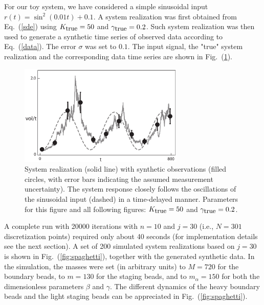 \documentclass[11pt]{article}
\theoremstyle{definition}
\begin{document}
For our toy system, we have considered a simple sinusoidal input  $r(t) = \sin^2 \left( 0.01 t \right) + 0.1$. A system realization was first obtained from Eq.~(\ref{sde}) using $K_{\mbox{\small true}} = 50$ and $\gamma_{\mbox{\small true}}=0.2$.
Such system realization was then used to generate a synthetic time series of observed data according to Eq.~(\ref{data}). The error $\sigma$ was set to $0.1$. The input signal, the "true" system realization and the corresponding data time series are shown in Fig.~(\ref{fig:rain_data_S}).
\begin{figure}[htb!]
    \centering
    \includegraphics[width=0.7\textwidth]{Fig2.pdf}
    \caption{\label{fig:rain_data_S}
    System realization (solid line) with synthetic observations (filled circles, with error bars indicating the assumed measurement uncertainty).
    The system response closely follows the oscillations of the sinusoidal input (dashed) in a time-delayed manner.
    Parameters for this figure and all following figures: $K_{\mbox{\small true}} = 50$ and $\gamma_{\mbox{\small true}} = 0.2$.
}
\end{figure}
A complete run with 20000 iterations with $n=10$ and $j=30$ (i.e., $N = 301$ discretization points) required only about 40 seconds (for implementation details see the next section). A set of 200 simulated system realizations based on $j=30$ is shown in Fig.~(\ref{fig:spaghetti}), together with the generated synthetic data. In the simulation, the masses were set (in arbitrary units) to $M=720$ for the boundary beads, to $m=130$ for the staging beads, and to $m_\alpha=150$ for both the dimensionless parameters $\beta$ and $\gamma$. The different dynamics of the heavy boundary beads and the light staging beads can be appreciated in Fig.~(\ref{fig:spaghetti}).
\end{document}
